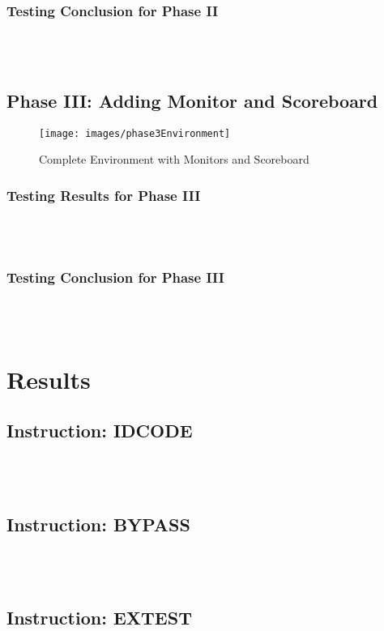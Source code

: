 \documentclass[a4paper,11pt]{article}
\begin{document}
\subsubsection{Testing Conclusion for Phase II}
\ \\ 
\ \\


\FloatBarrier
\subsection{Phase III: Adding Monitor and Scoreboard}

\begin{figure}[ht]
\centering
\texttt{[image: images/phase3Environment]}
\caption{Complete Environment with Monitors and Scoreboard}
\end{figure}

\subsubsection{Testing Results for Phase III}
\ \\
\ \\
\subsubsection{Testing Conclusion for Phase III}
\ \\ 
\ \\

\newpage
\pagebreak
\section{Results}
\subsection{Instruction: IDCODE}
\ \\
\ \\
\subsection{Instruction: BYPASS}
\ \\
\ \\

\subsection{Instruction: EXTEST}
\ \\
\ \\
\end{document}
